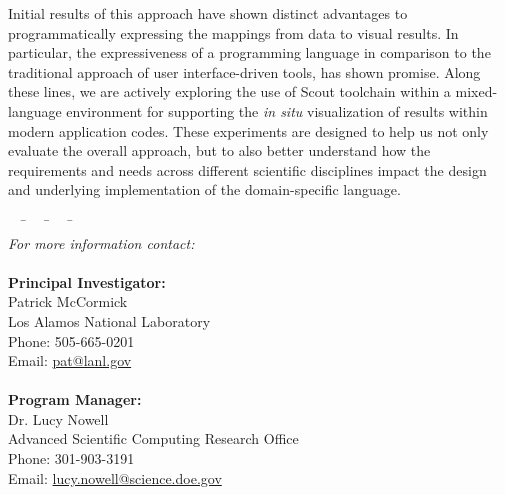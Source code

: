 \documentclass{tcvg}
\newcommand{\email}[1] {\href{mailto:#1}{#1}}
\newcommand{\backgroundpic}[1] {
	\ClearShipoutPicture
	\AddToShipoutPicture{
		\put(0,0) {
			\parbox[b][\paperheight]{\paperwidth}{
				\vfill
				\centering
				\texttt{[image: \#1]}
				\vfill
			}
		}
	}
}
\begin{document}
  \backgroundpic{figures/bg-back.pdf}

    Initial results of this approach have shown distinct advantages to
    programmatically expressing the mappings from data to visual results.
    In particular, the expressiveness of a programming language in 
    comparison to the traditional approach of user interface-driven tools, 
    has shown promise.  Along these lines, we are actively exploring the 
    use of Scout toolchain within a mixed-language environment for 
    supporting the \emph{in situ} visualization of results within modern
    application codes.  These experiments are designed to help us not 
    only evaluate the overall approach, but to also better understand how
    the requirements and needs across different scientific disciplines
    impact the design and underlying implementation of the domain-specific
    language.  

  
  


  \begin{snugshade}
	\vspace{-0.1in}
    \begin{tabbing}
	  ~~ \= ~~ \= ~~ \= ~~ \=\\
      \emph{For more information contact:}\\
	  \\
      \noindent 
      \> \textbf{Principal Investigator:}\\
	  \>\> Patrick McCormick\\
	  \>\> Los Alamos National Laboratory\\
	  \>\> Phone: 505-665-0201\\
	  \>\> Email: \email{pat@lanl.gov}\\
      \\
	 \> \textbf{Program Manager:}\\
	  \>\> Dr. Lucy Nowell\\
	  \>\> Advanced Scientific Computing Research Office\\
	  \>\> Phone: 301-903-3191\\
	  \>\> Email: \email{lucy.nowell@science.doe.gov}
	\end{tabbing}
  \end{snugshade}  
\end{document}
